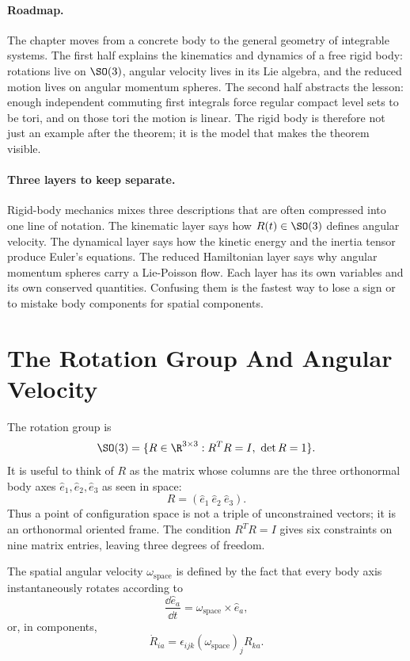 \paragraph{Roadmap.}
The chapter moves from a concrete body to the general geometry of integrable
systems. The first half explains the kinematics and dynamics of a free rigid
body: rotations live on \(\SO(3)\), angular velocity lives in its Lie algebra,
and the reduced motion lives on angular momentum spheres. The second half
abstracts the lesson: enough independent commuting first integrals force
regular compact level sets to be tori, and on those tori the motion is linear.
The rigid body is therefore not just an example after the theorem; it is the
model that makes the theorem visible.

\paragraph{Three layers to keep separate.}
Rigid-body mechanics mixes three descriptions that are often compressed into
one line of notation. The kinematic layer says how \(R(t)\in\SO(3)\) defines
angular velocity. The dynamical layer says how the kinetic energy and the
inertia tensor produce Euler's equations. The reduced Hamiltonian layer says
why angular momentum spheres carry a Lie-Poisson flow. Each layer has its own
variables and its own conserved quantities. Confusing them is the fastest way
to lose a sign or to mistake body components for spatial components.

\section{The Rotation Group And Angular Velocity}
\label{sec:rotation-group-angular-velocity}

The rotation group is
\[
  \SO(3)=\{R\in\R^{3\times 3}:R^TR=I,\ \det R=1\}.
\]
It is useful to think of \(R\) as the matrix whose columns are the three
orthonormal body axes \(\hat e_1,\hat e_2,\hat e_3\) as seen in space:
\[
  R=(\hat e_1\ \hat e_2\ \hat e_3).
\]
Thus a point of configuration space is not a triple of unconstrained vectors;
it is an orthonormal oriented frame. The condition \(R^TR=I\) gives six
constraints on nine matrix entries, leaving three degrees of freedom.

The spatial angular velocity \(\omega_{\mathrm{space}}\) is defined by the fact that every body
axis instantaneously rotates according to
\[
  \frac{\dd \hat e_a}{\dd t}=\omega_{\mathrm{space}}\times\hat e_a,
\]
or, in components,
\[
  \dot R_{ia}=\epsilon_{ijk}(\omega_{\mathrm{space}})_jR_{ka}.
\]

